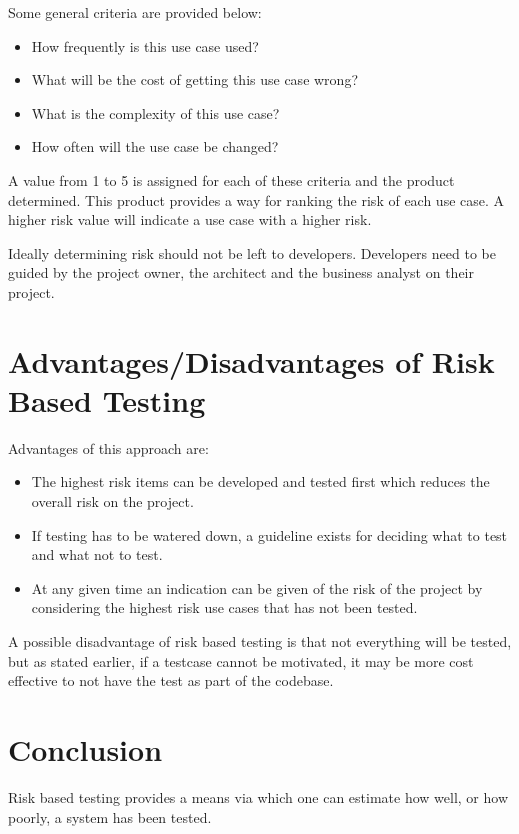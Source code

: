 \documentclass{amsart}
\begin{document}
Some general criteria are provided below:
\begin{itemize}
 \item How frequently is this use case used?
 \item What will be the cost of getting this use case wrong?
 \item What is the complexity of this use case?
 \item How often will the use case be changed?
\end{itemize}

A value from 1 to 5 is assigned for each of these criteria and the product determined. This product
provides a way for ranking the risk of each use case. A higher risk value will indicate a use case with a
higher risk.

Ideally determining risk should not be left to developers. Developers need to be guided by the project owner, the architect and the business analyst on their project.

\section{Advantages/Disadvantages of Risk Based Testing}
Advantages of this approach are:
\begin{itemize}
 \item The highest risk items can be developed and tested first which reduces the overall risk on
the project.
 \item If testing has to be watered down, a guideline exists for deciding what to test and what not
to test.
 \item At any given time an indication can be given of the risk of the project by considering the
highest risk use cases that has not been tested.
\end{itemize}

A possible disadvantage of risk based testing is that not everything will be tested, but as stated earlier, if a testcase cannot be motivated, it may be more cost effective to not have the test as part of the codebase.

\section{Conclusion}
Risk based testing provides a means via which one can estimate how well, or how poorly, a system has been tested.


  
  
 
\end{document}
